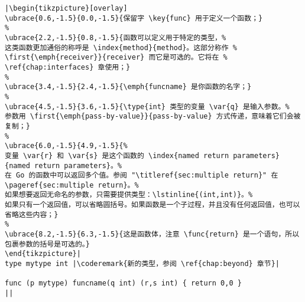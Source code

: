 \begin{lstlisting}[caption=函数定义,label=src:function definition]
|\begin{tikzpicture}[overlay]
\ubrace{0.6,-1.5}{0.0,-1.5}{保留字 \key{func} 用于定义一个函数；}
%
\ubrace{2.2,-1.5}{0.8,-1.5}{函数可以定义用于特定的类型，%
这类函数更加通俗的称呼是 \index{method}{method}。这部分称作 %
\first{\emph{receiver}}{receiver} 而它是可选的。它将在 %
\ref{chap:interfaces} 章使用；}
%
\ubrace{3.4,-1.5}{2.4,-1.5}{\emph{funcname} 是你函数的名字；}
%
\ubrace{4.5,-1.5}{3.6,-1.5}{\type{int} 类型的变量 \var{q} 是输入参数。%
参数用 \first{\emph{pass-by-value}}{pass-by-value} 方式传递，意味着它们会被复制；}
%
\ubrace{6.0,-1.5}{4.9,-1.5}{%
变量 \var{r} 和 \var{s} 是这个函数的 \index{named return parameters}{named return parameters}。%
在 Go 的函数中可以返回多个值。参阅 "\titleref{sec:multiple return}" 在 \pageref{sec:multiple return}。%
如果想要返回无命名的参数，只需要提供类型：\lstinline{(int,int)}。%
如果只有一个返回值，可以省略圆括号。如果函数是一个子过程，并且没有任何返回值，也可以省略这些内容；}
%
\ubrace{8.2,-1.5}{6.3,-1.5}{这是函数体，注意 \func{return} 是一个语句，所以包裹参数的括号是可选的。}
\end{tikzpicture}|
type mytype int	|\coderemark{新的类型，参阅 \ref{chap:beyond} 章节}|

func (p mytype) funcname(q int) (r,s int) { return 0,0 }
||
\end{lstlisting}
